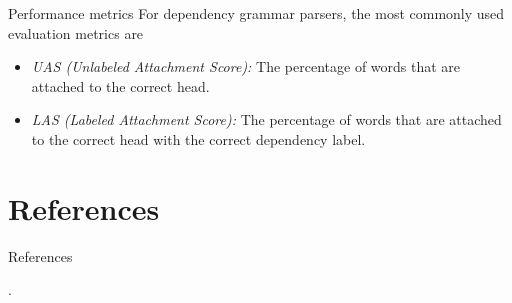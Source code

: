 \documentclass[style=upen, size=14pt]{powerdot}
\newcommand{\gold}{\color{arany}}
\theoremstyle{definition}
\begin{document}
\begin{slide}{Performance metrics}
  For dependency grammar parsers, the most commonly used evaluation metrics are
  \begin{itemize}
  \item \emph{\gold UAS (Unlabeled Attachment Score):} The percentage of words that are
    attached to the correct head.
  \item \emph{\gold LAS (Labeled Attachment Score):} The percentage of words that are
    attached to the correct head with the correct dependency label.
  \end{itemize}
\end{slide}

\section{References}

\begin{slide}{References}
  
  \begin{footnotesize}

    .\medskip


  \end{footnotesize}
\end{slide}

    
    
\end{document}
